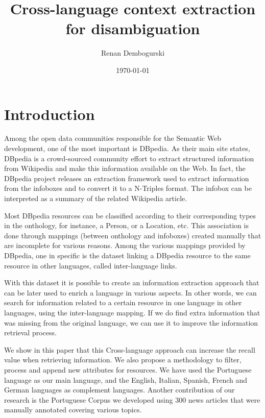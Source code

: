 \documentclass[10pt,a4paper]{llncs}
\title{Cross-language context extraction for disambiguation}
\author{Renan Dembogurski}
\date{\today}
\begin{document}
\maketitle

\begin{abstract}
\end{abstract}

\section{Introduction}

Among the open data communities responsible for the Semantic Web development, one of the most important is DBpedia. As their main site states, DBpedia is a crowd-sourced community effort to extract structured information from Wikipedia and make this information available on the Web. In fact, the DBpedia project releases an extraction framework used to extract information from the infoboxes and to convert it to a N-Triples format. The infobox can be interpreted as a summary of the related Wikipedia article.

Most DBpedia resources can be classified according to their corresponding types in the onthology, for instance, a Person, or a Location, etc. This association is done through mappings (between onthology and infoboxes) created manually that are incomplete for various reasons. Among the various mappings provided by DBpedia, one in specific is the dataset linking a DBpedia resource to the same resource in other languages, called inter-language links.

With this dataset it is possible to create an information extraction approach that can be later used to enrich a language in various aspects. In other words, we can search for information related to a certain resource in one language in other languages, using the inter-language mapping. If we do find extra information that was missing from the original language, we can use it to improve the information retrieval process.

We show in this paper that this Cross-language approach can increase the recall value when retrieving information. We also propose a methodology to filter, process and append new attributes for resources. We have used the Portuguese language as our main language, and the English, Italian, Spanish, French and German languages as complement languages. Another contribution of our research is the Portuguese Corpus we developed using $300$ news articles that were manually annotated covering various topics.
\end{document}
